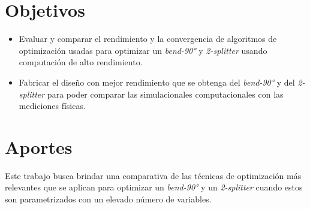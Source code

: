 \section{Objetivos}

\begin{itemize}

  \item Evaluar y comparar el rendimiento y la convergencia de algoritmos de optimización usadas para optimizar un \emph{bend-90°} y \emph{2-splitter} usando computación de alto rendimiento.

  \item Fabricar el diseño con mejor rendimiento que se obtenga del \emph{bend-90°} y del \emph{2-splitter} para poder comparar las simulacionales computacionales con las mediciones físicas.


\end{itemize}



\section{Aportes}

Este trabajo busca brindar una comparativa de las técnicas de optimización más relevantes que se aplican para optimizar un \emph{bend-90°} y un \emph{2-splitter} cuando estos son parametrizados con un elevado número de variables.

